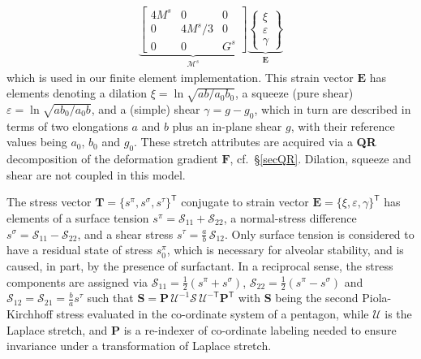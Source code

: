 \begin{subequations}
\begin{align}
    \underbrace{ \begin{bmatrix} 
    4M^s & 0 & 0 \\ 0 & 4M^s/3 & 0 \\ 0 & 0 & G^s 
    \end{bmatrix} }_{\boldsymbol{\mathcal{M}}^s} 
    \underbrace{ \left\{ \begin{matrix} 
    \xi \\ \varepsilon \\ \gamma \end{matrix} 
    \right\} }_{\boldsymbol{E}} 
    \label{pentagonSecantModulus}
    \end{align}
\end{subequations}
which is used in our finite element implementation.  This strain vector $\boldsymbol{E}$ has elements denoting a dilation $\xi = \ln\sqrt{ab/a_0b_0}$, a squeeze (pure shear) $\varepsilon = \ln\sqrt{ab_0/a_0b}$, and a (simple) shear $\gamma = g-g_0$, which in turn are described in terms of two elongations $a$ and $b$ plus an in-plane shear $g$, with their reference values being $a_0$, $b_0$ and $g_0$. These stretch attributes are acquired via a \textbf{QR} decomposition of the deformation gradient $\mathbf{F}$, cf.\ \S\ref{secQR}.    Dilation, squeeze and shear are not coupled in this model.

The stress vector $\boldsymbol{T} = \{ s^{\pi}, s^{\sigma}, s^{\tau} \}^{\mathsf{T}}$ conjugate to strain vector $\boldsymbol{E} = \{ \xi, \varepsilon, \gamma \}^{\mathsf{T}}$ has elements of a surface tension $s^{\pi} = \mathcal{S}_{11} + \mathcal{S}_{22}$, a normal-stress difference $s^{\sigma} = \mathcal{S}_{11} - \mathcal{S}_{22}$, and a shear stress $s^{\tau} = \tfrac{a}{b} \, \mathcal{S}_{12}$.  Only surface tension is considered to have a residual state of stress $s^{\pi}_0$, which is necessary for alveolar stability, and is caused, in part, by the presence of surfactant.  In a reciprocal sense, the stress components are assigned via $\mathcal{S}_{11} = \frac{1}{2} ( s^{\pi} + s^{\sigma} )$, $\mathcal{S}_{22} = \frac{1}{2} ( s^{\pi} - s^{\sigma} )$ and $\mathcal{S}_{12} = \mathcal{S}_{21} = \frac{b}{a} s^{\tau}$ such that $\mathbf{S} = \mathbf{P} \, \boldsymbol{\mathcal{U}}^{-1} \boldsymbol{\mathcal{S}} \, \boldsymbol{\mathcal{U}}^{-\mathsf{T}} \mathbf{P}^{\mathsf{T}}$ with $\mathbf{S}$ being the second Piola-Kirchhoff stress evaluated in the co-ordinate system of a pentagon, while $\boldsymbol{\mathcal{U}}$ is the Laplace stretch, and $\mathbf{P}$ is a re-indexer of co-ordinate labeling needed to ensure invariance under a transformation of Laplace stretch.

